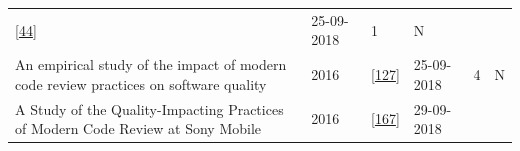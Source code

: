 \documentclass[]{book}
\begin{document}
\begin{longtable}[]{@{}llllll@{}}
\begin{minipage}[t]{0.13\columnwidth}
{[}\protect\hyperlink{ref-cohen2010modern}{44}{]}\strut
\end{minipage} & \begin{minipage}[t]{0.06\columnwidth}\raggedright\strut
25-09-2018\strut
\end{minipage} & \begin{minipage}[t]{0.07\columnwidth}\raggedright\strut
1\strut
\end{minipage} & \begin{minipage}[t]{0.08\columnwidth}\raggedright\strut
N\strut
\end{minipage}\tabularnewline
\begin{minipage}[t]{0.47\columnwidth}\raggedright\strut
An empirical study of the impact of modern code review practices on
software quality\strut
\end{minipage} & \begin{minipage}[t]{0.03\columnwidth}\raggedright\strut
2016\strut
\end{minipage} & \begin{minipage}[t]{0.13\columnwidth}\raggedright\strut
{[}\protect\hyperlink{ref-mcintosh2016empirical}{127}{]}\strut
\end{minipage} & \begin{minipage}[t]{0.06\columnwidth}\raggedright\strut
25-09-2018\strut
\end{minipage} & \begin{minipage}[t]{0.07\columnwidth}\raggedright\strut
4\strut
\end{minipage} & \begin{minipage}[t]{0.08\columnwidth}\raggedright\strut
N\strut
\end{minipage}\tabularnewline
\begin{minipage}[t]{0.47\columnwidth}\raggedright\strut
A Study of the Quality-Impacting Practices of Modern Code Review at Sony
Mobile\strut
\end{minipage} & \begin{minipage}[t]{0.03\columnwidth}\raggedright\strut
2016\strut
\end{minipage} & \begin{minipage}[t]{0.13\columnwidth}\raggedright\strut
{[}\protect\hyperlink{ref-shimagaki2016study}{167}{]}\strut
\end{minipage} & \begin{minipage}[t]{0.06\columnwidth}\raggedright\strut
29-09-2018\strut
\end{minipage} & \begin{minipage}[t]{0.07\columnwidth}\raggedright\strut

\end{minipage}
\end{longtable}
\end{document}
